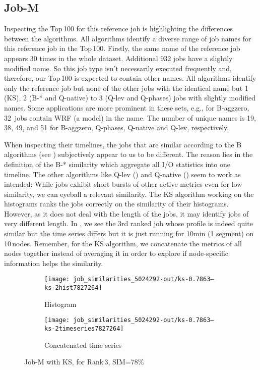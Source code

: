 \documentclass{jhps}
\begin{document}
\subsection{Job-M}

Inspecting the Top\,100 for this reference job is highlighting the differences between the algorithms.
All algorithms identify a diverse range of job names for this reference job in the Top\,100.
Firstly, the same name of the reference job appears 30 times in the whole dataset. 
Additional 932 jobs have a slightly modified name.
So this job type isn't necessarily executed frequently and, therefore, our Top\,100 is expected to contain other names.
All algorithms identify only the reference job but none of the other jobs with the identical name but 1 (KS), 2 (B-* and Q-native) to 3 (Q-lev and Q-phases) jobs with slightly modified names.
Some applications are more prominent in these sets, e.g., for B-aggzero, 32~jobs contain WRF (a model) in the name.
The number of unique names is 19, 38, 49, and 51 for B-aggzero, Q-phases, Q-native and Q-lev, respectively.

When inspecting their timelines, the jobs that are similar according to the B algorithms (see ) subjectively appear to us to be different. 
The reason lies in the definition of the B-* similarity which aggregate all I/O statistics into one timeline.
The other algorithms like Q-lev () and Q-native () seem to work as intended:
While jobs exhibit short bursts of other active metrics even for low similarity, we can eyeball a relevant similarity.
The KS algorithm working on the histograms ranks the jobs correctly on the similarity of their histograms.
However, as it does not deal with the length of the jobs, it may identify jobs of very different length.
In , we see the 3rd ranked job whose profile is indeed quite similar but the time series differs but it is just running for 10min (1 segment) on 10\,nodes.
Remember, for the KS algorithm, we concatenate the metrics of all nodes together instead of averaging it in order to explore if node-specific information helps the similarity.

\begin{figure}[bt]
\begin{subfigure}{0.5\textwidth}
\centering
\texttt{[image: job\_similarities\_5024292-out/ks-0.7863--ks-2hist7827264]}
\caption{Histogram}
\end{subfigure}
\qquad
\begin{subfigure}{0.36\textwidth}
\centering
\texttt{[image: job\_similarities\_5024292-out/ks-0.7863--ks-2timeseries7827264]}
\caption{Concatenated time series}
\end{subfigure}

\caption{Job-M with KS, for Rank\,3, SIM=78\%}%
\label{fig:job-M-ks}
\end{figure}
\end{document}
